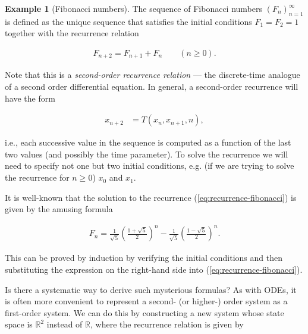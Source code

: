 \documentclass[11pt]{report}
\theoremstyle{plain}
\theoremstyle{definition}
\newtheorem{example}[thm]{Example}
\begin{document}
\begin{example}[Fibonacci numbers]
The sequence of Fibonacci numbers $(F_n)_{n=1}^\infty$
is defined as the unique sequence that satisfies the
initial conditions $F_1=F_2=1$ together with the
recurrence relation

\begin{equation*} \tag{31}\label{eq:recurrence-fibonacci}
\begin{split}
F_{n+2}=F_{n+1}+F_n \qquad (n\ge0).
\end{split}
\end{equation*}

Note that this is a \emph{second-order recurrence
relation} --- the discrete-time analogue of a second
order differential equation. In general, a
second-order recurrence will have the form

\begin{align*}
x_{n+2} &= T(x_n,x_{n+1},n),
\end{align*}

i.e., each successive value in the sequence is
computed as a function of the last two values (and
possibly the time parameter). To solve the recurrence
we will need to specify not one but two initial
conditions, e.g. (if we are trying to solve the
recurrence for $n\ge0$) $x_0$ and $x_1$.

It is well-known that the solution to the recurrence
(\ref{eq:recurrence-fibonacci}) is given by the amusing
formula

\begin{equation*} \tag{32}\label{eq:fibonacci-closedform}
\begin{split}
F_n = \frac{1}{\sqrt{5}}\left(\frac{1+\sqrt{5}}{2}\right)^n-\frac{1}{\sqrt{5}}\left(\frac{1-\sqrt{5}}{2}\right)^n.
\end{split}
\end{equation*}

This can be proved by induction by verifying the
initial conditions and then substituting the
expression on the right-hand side into
(\ref{eq:recurrence-fibonacci}).

Is there a systematic way to derive such mysterious
formulas? As with ODEs, it is often more convenient to
represent a second- (or higher-) order system as a
first-order system. We can do this by constructing a
new system whose state space is $\mathbb{R}^2$
instead of $\mathbb{R}$, where the recurrence
relation is given by


\end{example}
\end{document}
